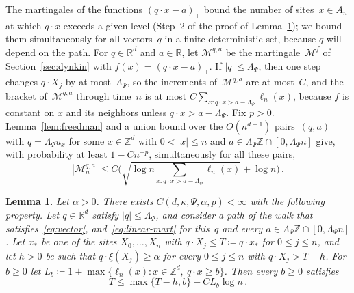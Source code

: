 \documentclass[11pt]{amsart}
\theoremstyle{plain}
\newtheorem{lemma}[theorem]{Lemma}
\theoremstyle{definition}
\newcommand{\Z}{\mathbb Z}
\newcommand{\R}{\mathbb R}
\newcommand{\drift}{\kappa}
\newcommand{\gauge}{\Psi}
\numberwithin{equation}{section}
\begin{document}
The martingales of the functions $(q\cdot x-a)_+$ bound the number of sites~$x\in A_n$ at which $q\cdot x$ exceeds a given level (Step~2 of the proof of Lemma~\ref{lem:outer-crossing}); we bound them simultaneously for all vectors~$q$ in a finite deterministic set, because $q$ will depend on the path. For $q\in\R^d$ and $a\in\R$, let $\mathcal M^{q,a}$ be the martingale~$\mathcal M^f$ of Section~\ref{sec:dynkin} with $f(x)=(q\cdot x-a)_+$. If $|q|\leq\Lambda_\gauge$, then one step changes $q\cdot X_j$ by at most~$\Lambda_\gauge$, so the increments of~$\mathcal M^{q,a}$ are at most~$C$, and the bracket of~$\mathcal M^{q,a}$ through time~$n$ is at most $C\sum_{x:q\cdot x>a-\Lambda_\gauge}\ell_n(x)$, because $f$ is constant on $x$ and its neighbors unless $q\cdot x>a-\Lambda_\gauge$. Fix $p>0$. Lemma~\ref{lem:freedman} and a union bound over the $O(n^{d+1})$ pairs~$(q,a)$ with $q=\Lambda_\gauge u_x$ for some $x\in\Z^d$ with $0<|x|\leq n$ and $a\in\Lambda_\gauge\Z\cap[0,\Lambda_\gauge n]$ give, with probability at least $1-Cn^{-p}$, simultaneously for all these pairs,
\begin{equation}\label{eq:linear-mart}
|\mathcal M^{q,a}_n|\leq C\biggl(\sqrt{\log n\sum_{x:q\cdot x>a-\Lambda_\gauge}\ell_n(x)}+\log n\biggr)\, .
\end{equation}

\begin{lemma}\label{lem:outer-crossing}
Let $\alpha>0$. There exists $C(d,\drift,\gauge,\alpha,p)<\infty$ with the following property. Let $q\in\R^d$ satisfy $|q|\leq\Lambda_\gauge$, and consider a path of the walk that satisfies~\eqref{eq:vector}, and~\eqref{eq:linear-mart} for this~$q$ and every $a\in\Lambda_\gauge\Z\cap[0,\Lambda_\gauge n]$. Let $x_*$ be one of the sites $X_0,\ldots,X_n$ with $q\cdot X_j\leq T\coloneqq q\cdot x_*$ for $0\leq j\leq n$, and let $h>0$ be such that $q\cdot\xi(X_j)\geq\alpha$ for every $0\leq j\leq n$ with $q\cdot X_j>T-h$. For $b\geq0$ let $L_b\coloneqq1+\max\{\ell_n(x):x\in\Z^d,\ q\cdot x\geq b\}$. Then every $b\geq0$ satisfies
\begin{equation}\label{eq:outer-crossing}
T\leq\max\{T-h,b\}+CL_b\log n\, .
\end{equation}
\end{lemma}
\end{document}
